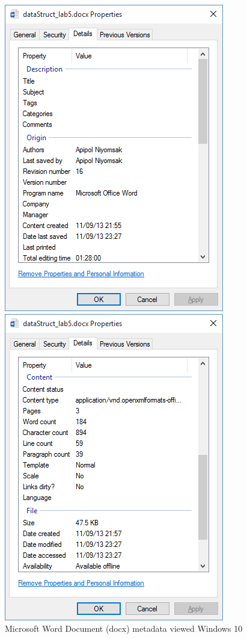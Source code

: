 \begin{figure}[h]
	\centering
	\begin{minipage}{0.45\textwidth}
		\centering
		\includegraphics*[scale=0.6]{res/bg-knowledge/metadata-ex-doc}
	\end{minipage} \hfill
	\begin{minipage}{0.45\textwidth}
		\centering
		\includegraphics*[scale=0.6]{res/bg-knowledge/metadata-ex-doc2}
	\end{minipage} \hfill	
	
	\caption{Microsoft Word Document (docx) metadata viewed Windows 10}
	\label{metadata-ex-doc}
\end{figure}
